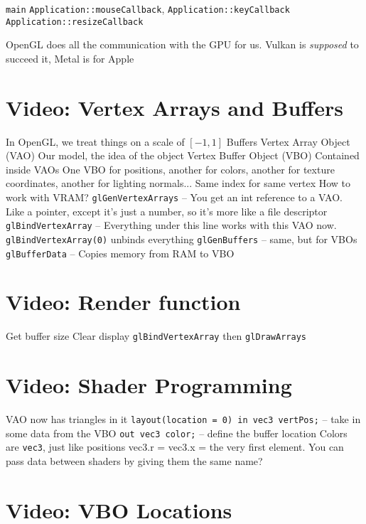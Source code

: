 \begin{outline}
    \1 \texttt{main}
    \1 \texttt{Application::mouseCallback}, \texttt{Application::keyCallback}
    \1 \texttt{Application::resizeCallback}
\end{outline}

OpenGL does all the communication with the GPU for us. Vulkan is \textit{supposed} to succeed it, Metal is for Apple

\section{Video: Vertex Arrays and Buffers}

\begin{outline}
    \1 In OpenGL, we treat things on a scale of $[-1, 1]$
    \1 Buffers
        \2 Vertex Array Object (VAO)
            \3 Our model, the idea of the object
        \2 Vertex Buffer Object (VBO)
            \2 Contained inside VAOs
            \2 One VBO for positions, another for colors, another for texture coordinates, another for lighting normals...
            \2 Same index for same vertex
    \1 How to work with VRAM?
        \2 \texttt{glGenVertexArrays} -- You get an int reference to a VAO. Like a pointer, except it's just a number, so it's more like a file descriptor
        \2  \texttt{glBindVertexArray} -- Everything under this line works with this VAO now. \texttt{glBindVertexArray(0)} unbinds everything
        \2 \texttt{glGenBuffers} -- same, but for VBOs
        \2 \texttt{glBufferData} -- Copies memory from RAM to VBO
\end{outline}

\section{Video: Render function}

\begin{outline}[enumerate]
    \1 Get buffer size
    \1 Clear display
    \1 \texttt{glBindVertexArray} then \texttt{glDrawArrays}
\end{outline}

\section{Video: Shader Programming}

\begin{outline}[]
    \1 VAO now has triangles in it
    \1 \texttt{layout(location = 0) in vec3 vertPos;} -- take in some data from the VBO
    \1 \texttt{out vec3 color;} -- define the buffer location
    \1 Colors are \texttt{vec3},  just like positions
        \2 vec3.r = vec3.x = the very first element.
    \1 You can pass data between shaders by giving them the same name?
\end{outline}

\section{Video: VBO Locations}


